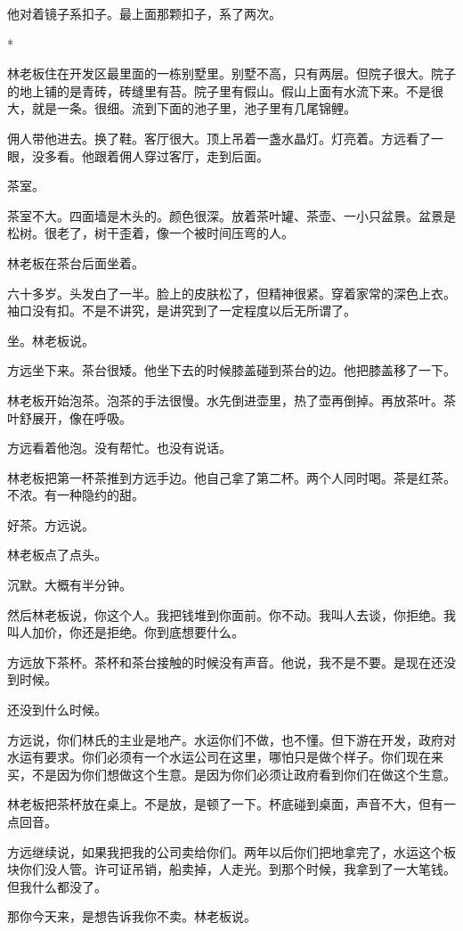 \documentclass[UTF8,a5paper,11pt,openany]{ctexbook}
\newcommand{\scene}{\vspace{1em}\begin{center}*\quad*\quad*\end{center}\vspace{0.5em}}
\begin{document}
他对着镜子系扣子。最上面那颗扣子，系了两次。


\scene

林老板住在开发区最里面的一栋别墅里。别墅不高，只有两层。但院子很大。院子的地上铺的是青砖，砖缝里有苔。院子里有假山。假山上面有水流下来。不是很大，就是一条。很细。流到下面的池子里，池子里有几尾锦鲤。

佣人带他进去。换了鞋。客厅很大。顶上吊着一盏水晶灯。灯亮着。方远看了一眼，没多看。他跟着佣人穿过客厅，走到后面。

茶室。

茶室不大。四面墙是木头的。颜色很深。放着茶叶罐、茶壶、一小只盆景。盆景是松树。很老了，树干歪着，像一个被时间压弯的人。

林老板在茶台后面坐着。

六十多岁。头发白了一半。脸上的皮肤松了，但精神很紧。穿着家常的深色上衣。袖口没有扣。不是不讲究，是讲究到了一定程度以后无所谓了。

坐。林老板说。

方远坐下来。茶台很矮。他坐下去的时候膝盖碰到茶台的边。他把膝盖移了一下。

林老板开始泡茶。泡茶的手法很慢。水先倒进壶里，热了壶再倒掉。再放茶叶。茶叶舒展开，像在呼吸。

方远看着他泡。没有帮忙。也没有说话。

林老板把第一杯茶推到方远手边。他自己拿了第二杯。两个人同时喝。茶是红茶。不浓。有一种隐约的甜。

好茶。方远说。

林老板点了点头。

沉默。大概有半分钟。

然后林老板说，你这个人。我把钱堆到你面前。你不动。我叫人去谈，你拒绝。我叫人加价，你还是拒绝。你到底想要什么。

方远放下茶杯。茶杯和茶台接触的时候没有声音。他说，我不是不要。是现在还没到时候。

还没到什么时候。

方远说，你们林氏的主业是地产。水运你们不做，也不懂。但下游在开发，政府对水运有要求。你们必须有一个水运公司在这里，哪怕只是做个样子。你们现在来买，不是因为你们想做这个生意。是因为你们必须让政府看到你们在做这个生意。

林老板把茶杯放在桌上。不是放，是顿了一下。杯底碰到桌面，声音不大，但有一点回音。

方远继续说，如果我把我的公司卖给你们。两年以后你们把地拿完了，水运这个板块你们没人管。许可证吊销，船卖掉，人走光。到那个时候，我拿到了一大笔钱。但我什么都没了。

那你今天来，是想告诉我你不卖。林老板说。
\end{document}
